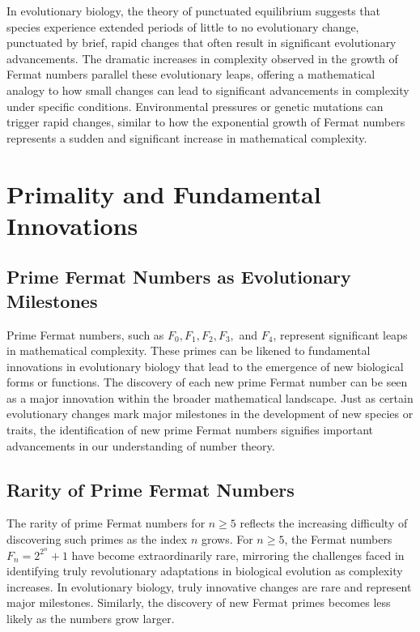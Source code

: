 \documentclass[12pt]{article}
\begin{document}
In evolutionary biology, the theory of punctuated equilibrium suggests that species experience extended periods of little to no evolutionary change, punctuated by brief, rapid changes that often result in significant evolutionary advancements. The dramatic increases in complexity observed in the growth of Fermat numbers parallel these evolutionary leaps, offering a mathematical analogy to how small changes can lead to significant advancements in complexity under specific conditions. Environmental pressures or genetic mutations can trigger rapid changes, similar to how the exponential growth of Fermat numbers represents a sudden and significant increase in mathematical complexity.

\section{Primality and Fundamental Innovations}

\subsection{Prime Fermat Numbers as Evolutionary Milestones}

Prime Fermat numbers, such as \( F_0, F_1, F_2, F_3, \) and \( F_4 \), represent significant leaps in mathematical complexity. These primes can be likened to fundamental innovations in evolutionary biology that lead to the emergence of new biological forms or functions. The discovery of each new prime Fermat number can be seen as a major innovation within the broader mathematical landscape. Just as certain evolutionary changes mark major milestones in the development of new species or traits, the identification of new prime Fermat numbers signifies important advancements in our understanding of number theory.

\subsection{Rarity of Prime Fermat Numbers}

The rarity of prime Fermat numbers for \( n \geq 5 \) reflects the increasing difficulty of discovering such primes as the index \( n \) grows. For \( n \geq 5 \), the Fermat numbers \( F_n = 2^{2^n} + 1 \) have become extraordinarily rare, mirroring the challenges faced in identifying truly revolutionary adaptations in biological evolution as complexity increases. In evolutionary biology, truly innovative changes are rare and represent major milestones. Similarly, the discovery of new Fermat primes becomes less likely as the numbers grow larger.
\end{document}
